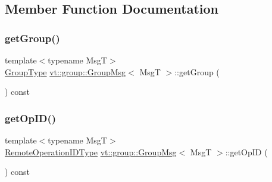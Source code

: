 \subsection{Member Function Documentation}
\mbox{\label{structvt_1_1group_1_1_group_msg_ad0879ce5e25a0dae015bef8eae74f507}} 
\subsubsection{\texorpdfstring{get\+Group()}{getGroup()}}
{\footnotesize\ttfamily template$<$typename MsgT$>$ \\
\hyperlink{namespacevt_a27b5e4411c9b6140c49100e050e2f743}{Group\+Type} \hyperlink{structvt_1_1group_1_1_group_msg}{vt\+::group\+::\+Group\+Msg}$<$ MsgT $>$\+::get\+Group (\begin{DoxyParamCaption}{ }\end{DoxyParamCaption}) const\hspace{0.3cm}{\ttfamily [inline]}}

\mbox{\label{structvt_1_1group_1_1_group_msg_a5dd1bb7ec287e2ff5d93537a6652c89e}} 
\subsubsection{\texorpdfstring{get\+Op\+I\+D()}{getOpID()}}
{\footnotesize\ttfamily template$<$typename MsgT$>$ \\
\hyperlink{namespacevt_1_1group_a73f2624ddeb535b39a08b6524f26b244}{Remote\+Operation\+I\+D\+Type} \hyperlink{structvt_1_1group_1_1_group_msg}{vt\+::group\+::\+Group\+Msg}$<$ MsgT $>$\+::get\+Op\+ID (\begin{DoxyParamCaption}{ }\end{DoxyParamCaption}) const\hspace{0.3cm}{\ttfamily [inline]}}

\mbox{\label{structvt_1_1group_1_1_group_msg_ad37e50e1a83cf6dd1101a34b36818707}} 
